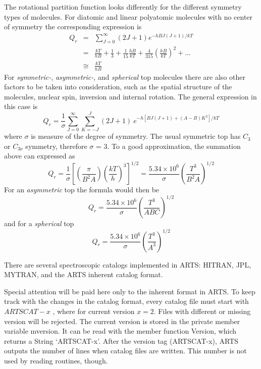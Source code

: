 The rotational partition function looks differently for the different
symmetry types of molecules.
For diatomic and linear  polyatomic molecules with no center of
symmetry the corresponding expression is 
\begin{eqnarray}
Q_r & = & \sum_{J=0}^\infty (2J+1)e^{-hBJ(J+1)/kT}\nonumber\\
   & = & \frac{kT}{hB}+\frac{1}{3}+\frac{1}{15}\frac{hB}{kT}+\frac{4}{315}\left(\frac{hB}{kT}\right)^2+...\nonumber\\
   & \cong & \frac{kT}{hB}
\end{eqnarray}
For {\it{symmetric-}}, {\it{asymmetric-}}, and {\it{spherical}} top molecules there are also
other factors to be taken into consideration, such as the
spatial structure of the molecules, nuclear spin, inversion and
internal rotation. The general expression in this case is
\begin{equation}
Q_r  =  \frac{1}{\sigma}\sum_{J=0}^\infty \sum_{K=-J}^{J}(2J+1)~e^{-h[BJ(J+1)+(A-B)K^2]/kT}
\end{equation}
where $\sigma$ is measure of the degree of symmetry. The usual
symmetric top has $C_3$ or $C_{3\nu}$ symmetry, therefore $\sigma$ = 3. To a good
approximation, the summation above can expressed as
\begin{equation}
Q_r  = 
\frac{1}{\sigma}\left[\left(\frac{\pi}{B^2A}\right)\left(\frac{kT}{h}\right)^3\right]^{1/2}=
\frac{5.34\times 10^6}{\sigma}\left(\frac{T^3}{B^{2}A}\right)^{1/2}
\end{equation}
For an  {\it{asymmetric}} top the formula would then be 
\begin{equation}
Q_r = \frac{5.34\times 10^6}{\sigma}\left(\frac{T^3}{ABC}\right)^{1/2}
\end{equation}
and for a {\it{spherical}} top
\begin{equation}
Q_r = \frac{5.34\times 10^6}{\sigma}\left(\frac{T^3}{A^3}\right)^{1/2}
\end{equation}








 There are several spectroscopic catalogs
implemented in ARTS: HITRAN, JPL, MYTRAN, and the ARTS inherent
catalog format.

Special attention will be paid here only to the inherent format in ARTS.
To keep track with the changes in the catalog format, every catalog file
must start with $ARTSCAT-x$ , where for current version $x=2$.  Files
with different or missing version will be rejected. The current
version is stored in the private member variable mversion. It can be
read with the member function Version, which returns a String `ARTSCAT-x'.
After the version tag (ARTSCAT-x), ARTS outputs the number of lines
when catalog files are written. This number is not used by reading
routines, though.

